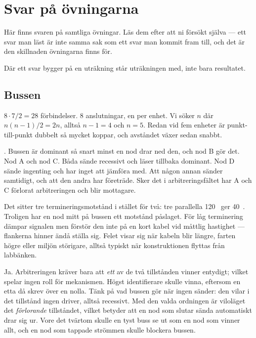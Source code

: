 \chapter{Svar på övningarna}
\label{ch:svar}

Här finns svaren på samtliga övningar. Läs dem efter att ni försökt själva --- ett svar man läst
är inte samma sak som ett svar man kommit fram till, och det är den skillnaden övningarna finns
för.

Där ett svar bygger på en uträkning står uträkningen med, inte bara resultatet.

\section{Bussen}

 $8 \cdot 7 / 2 = 28$ förbindelser.
 8 anslutningar, en per enhet.
 Vi söker $n$ där $n(n-1)/2 = 2n$, alltså $n - 1 = 4$ och $n = 5$. Redan vid fem enheter
är punkt-till-punkt dubbelt så mycket koppar, och avståndet växer sedan snabbt.

 \dom. Bussen är dominant så snart minst en nod drar ned den, och nod B gör det.
 Nod A och nod C. Båda sände recessivt och läser tillbaka dominant. Nod D sände ingenting
och har inget att jämföra med.
 Att någon annan sänder samtidigt, och att den andra har företräde. Sker det i
arbitreringsfältet har A och C förlorat arbitreringen och blir mottagare.

 Det sitter tre termineringsmotstånd i stället för två: tre parallella 120~\textohm{} ger
40~\textohm. Troligen har en nod mitt på bussen ett motstånd påslaget.
 För låg terminering dämpar signalen men förstör den inte på en kort kabel vid måttlig
hastighet --- flankerna hinner ändå ställa sig. Felet visar sig när kabeln blir längre, farten
högre eller miljön störigare, alltså typiskt när konstruktionen flyttas från labbänken.

 Ja. Arbitreringen kräver bara att \emph{ett} av de två tillstånden vinner entydigt; vilket
spelar ingen roll för mekanismen.
 Högst identifierare skulle vinna, eftersom en etta då skrev över en nolla.
 Tänk på vad bussen gör när ingen sänder: den vilar i det tillstånd ingen driver, alltså
recessivt. Med den valda ordningen är viloläget det \emph{förlorande} tillståndet, vilket betyder
att en nod som slutar sända automatiskt drar sig ur. Vore det tvärtom skulle en tyst buss se ut
som en nod som vinner allt, och en nod som tappade strömmen skulle blockera bussen.

